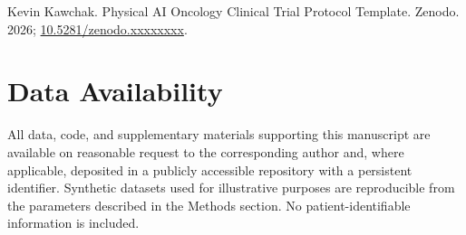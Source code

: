 Kevin Kawchak. Physical AI Oncology Clinical Trial Protocol Template. Zenodo. 2026;
\href{https://doi.org/10.5281/zenodo.xxxxxxxx}{10.5281/zenodo.xxxxxxxx}.

{}
\section*{Data Availability}
\label{sec:data}

All data, code, and supplementary materials supporting this manuscript are
available on reasonable request to the corresponding author and, where
applicable, deposited in a publicly accessible repository with a persistent
identifier. Synthetic datasets used for illustrative purposes are
reproducible from the parameters described in the Methods section. No
patient-identifiable information is included.
